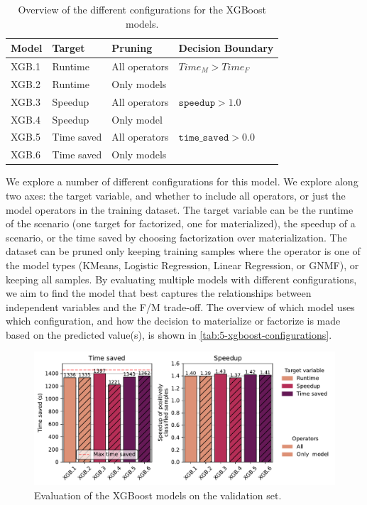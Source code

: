 \begin{table}[ht]
    \centering
    \begin{tabular}{llll}
        \toprule
        Model & Target     & Pruning       & Decision Boundary            \\
        \midrule \midrule
        XGB.1 & Runtime    & All operators & $Time_M > Time_F$            \\
        XGB.2 & Runtime    & Only models   &                              \\
        XGB.3 & Speedup    & All operators & $\texttt{speedup} > 1.0$     \\
        XGB.4 & Speedup    & Only model    &                              \\
        XGB.5 & Time saved & All operators & $\texttt{time\_saved} > 0.0$ \\
        XGB.6 & Time saved & Only models   &                              \\
        \bottomrule
    \end{tabular}
    \caption[XGBoost configurations]{Overview of the different configurations for the XGBoost models.}
    \label{tab:5-xgboost-configurations}
\end{table}

We explore a number of different configurations for this model. We explore along two axes: the target variable, and whether to include all operators, or just the model operators in the training dataset. The target variable can be the runtime of the scenario (one target for factorized, one for materialized), the speedup of a scenario, or the time saved by choosing factorization over materialization. The dataset can be pruned only keeping training samples where the operator is one of the model types (KMeans, Logistic Regression, Linear Regression, or GNMF), or keeping all samples. By evaluating multiple models with different configurations, we aim to find the model that best captures the relationships between independent variables and the F/M trade-off. The overview of which model uses which configuration, and how the decision to materialize or factorize is made based on the predicted value(s), is shown in \autoref{tab:5-xgboost-configurations}.

\begin{figure}[ht]
    \centering
    \includegraphics[width=\linewidth]{chapters/05_cost_estimation/figures/xgb-models-compare.pdf}
    \caption[XGBoost Estimator Comparison]{Evaluation of the XGBoost models on the validation set.}
    \label{fig:5-xgboost-evaluation}
\end{figure}


